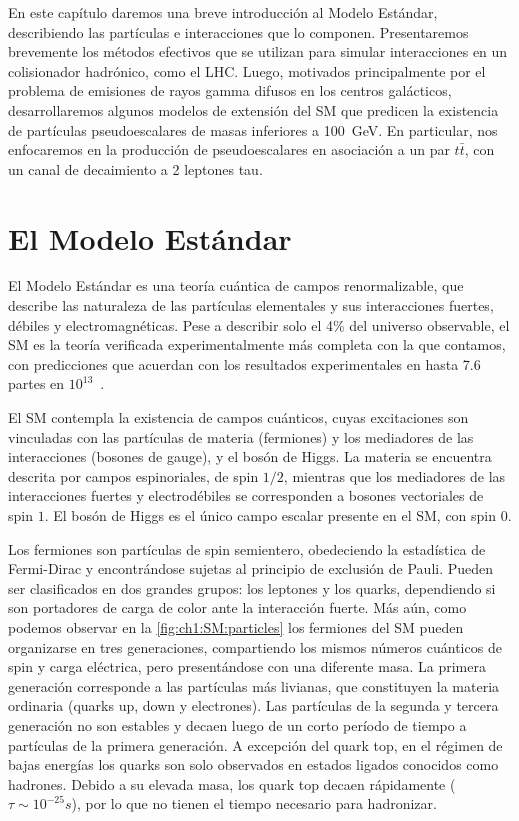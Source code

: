 En este capítulo daremos una breve introducción al Modelo Estándar, describiendo las partículas e interacciones que lo componen. Presentaremos brevemente los métodos efectivos que se utilizan para simular interacciones en un colisionador hadrónico, como el LHC. Luego, motivados principalmente por el problema de emisiones de rayos gamma difusos en los centros galácticos, desarrollaremos algunos modelos de extensión del SM que predicen la existencia de partículas pseudoescalares de masas inferiores a \SI{100}{\GeV}. En particular, nos enfocaremos en la producción de pseudoescalares en asociación a un par $t\bar{t}$, con un canal de decaimiento a 2 leptones tau.




\section{El Modelo Estándar}

El Modelo Estándar es una teoría cuántica de campos renormalizable, que describe las naturaleza de las partículas elementales y sus interacciones fuertes, débiles y electromagnéticas. Pese a describir solo el 4\% del universo observable, el SM es la teoría verificada experimentalmente más completa con la que contamos, con predicciones que acuerdan con los resultados experimentales en hasta 7.6 partes en $10^{13}$~\cite{Hanneke2008}.

El SM contempla la existencia de campos cuánticos, cuyas excitaciones son vinculadas con las partículas de materia (fermiones) y los mediadores de las interacciones (bosones de gauge), y el bosón de Higgs. La materia se encuentra descrita por campos espinoriales, de spin $1/2$, mientras que los mediadores de las interacciones fuertes y electrodébiles se corresponden a bosones vectoriales de spin $1$. El bosón de Higgs es el único campo escalar presente en el SM, con spin $0$.

Los fermiones son partículas de spin semientero, obedeciendo la estadística de Fermi-Dirac y encontrándose sujetas al principio de exclusión de Pauli. Pueden ser clasificados en dos grandes grupos: los leptones y los quarks, dependiendo si son portadores de carga de color ante la interacción fuerte. Más aún, como podemos observar en la \cref{fig:ch1:SM:particles} los fermiones del SM pueden organizarse en tres generaciones, compartiendo los mismos números cuánticos de spin y carga eléctrica, pero presentándose con una diferente masa. La primera generación corresponde a las partículas más livianas, que constituyen la materia ordinaria (quarks up, down y electrones). Las partículas de la segunda y tercera generación no son estables y decaen luego de un corto período de tiempo a partículas de la primera generación. A excepción del quark top, en el régimen de bajas energías los quarks son solo observados en estados ligados conocidos como hadrones. Debido a su elevada masa, los quark top decaen rápidamente ($\tau \sim 10^{-25}\si{s}$), por lo que no tienen el tiempo necesario para hadronizar.

